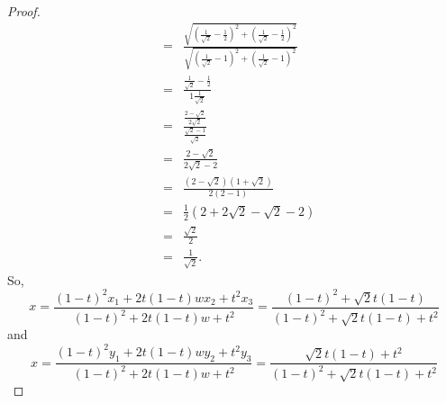 \begin{proof}
\begin{eqnarray*}
    & = & \frac{\sqrt{\left(\frac{1}{\sqrt{2}} - \frac{1}{2}\right)^2 + \left(\frac{1}{\sqrt{2}} - \frac{1}{2}\right)^2}}{\sqrt{\left(\frac{1}{\sqrt{2}} - 1\right)^2 + \left(\frac{1}{\sqrt{2}} - 1\right)^2}}\\
    & = & \frac{\frac{1}{\sqrt{2}} - \frac{1}{2}}{1 \frac{1}{\sqrt{2}}}\\
    & = & \frac{\frac{2 - \sqrt{2}}{2\sqrt{2}}}{\frac{\sqrt{2} - 1}{\sqrt{2}}}\\
    & = & \frac{2 - \sqrt{2}}{2\sqrt{2} - 2}\\
    & = & \frac{(2 - \sqrt{2})(1 + \sqrt{2})}{2(2 - 1)}\\
    & = & \frac{1}{2}(2 + 2\sqrt{2} - \sqrt{2} - 2)\\
    & = & \frac{\sqrt{2}}{2}\\
    & = & \frac{1}{\sqrt{2}}.    
\end{eqnarray*}
So,
$$x = \frac{(1- t)^2 x_1 + 2t(1-t)wx_2 + t^2 x_3}{(1- t)^2 + 2t(1-t)w + t^2} = \frac{(1- t)^2 + \sqrt{2}t(1-t)}{(1- t)^2 + \sqrt{2}t(1-t) + t^2}$$
and
$$x = \frac{(1- t)^2 y_1 + 2t(1-t)wy_2 + t^2 y_3}{(1- t)^2 + 2t(1-t)w + t^2} = \frac{\sqrt{2}t(1-t) + t^2}{(1- t)^2 + \sqrt{2}t(1-t) + t^2}$$
\end{proof}









